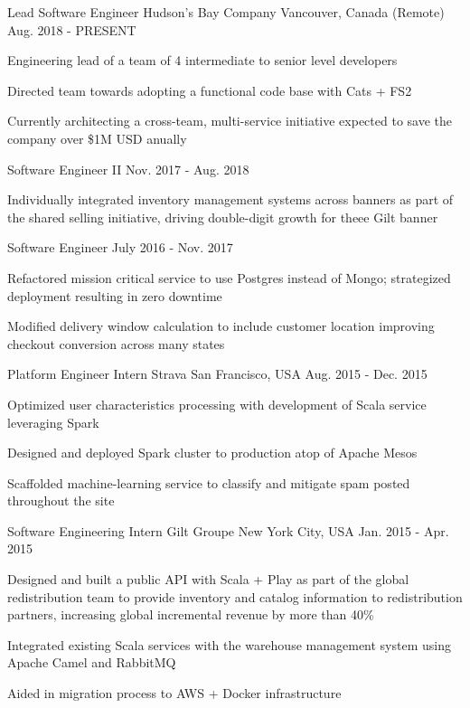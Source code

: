 \begin{cventries}
  \cventry
    {Lead Software Engineer}
    {Hudson's Bay Company}
    {Vancouver, Canada (Remote)}
    {Aug. 2018 - PRESENT}
    {
      \begin{cvitems}
        \item {Engineering lead of a team of 4 intermediate to senior level developers}
        \item {Directed team towards adopting a functional code base with Cats + FS2}
        \item {Currently architecting a cross-team, multi-service
            initiative expected to save the company over \$1M USD anually}
      \end{cvitems}
    }
  \cventry
    {Software Engineer II}
    {}
    {}
    {Nov. 2017 - Aug. 2018}
    {
      \begin{cvitems}
        \item {Individually integrated inventory management systems across banners as part of
            the shared selling initiative, driving double-digit growth for theee Gilt banner}
      \end{cvitems}
    }
  \cventry
    {Software Engineer}
    {}
    {}
    {July 2016 - Nov. 2017}
    {
      \begin{cvitems}
        \item {Refactored mission critical service to use Postgres instead of Mongo; strategized deployment resulting in zero downtime}
        \item {Modified delivery window calculation to include customer location improving checkout conversion across many states}
      \end{cvitems}
    }
  \cventry
    {Platform Engineer Intern}
    {Strava}
    {San Francisco, USA}
    {Aug. 2015 - Dec. 2015}
    {
      \begin{cvitems}
        \item {Optimized user characteristics processing with development of Scala service leveraging Spark}
        \item {Designed and deployed Spark cluster to production atop of Apache Mesos}
        \item {Scaffolded machine-learning service to classify and mitigate spam posted throughout the site}
      \end{cvitems}
    }
  \cventry
    {Software Engineering Intern}
    {Gilt Groupe}
    {New York City, USA}
    {Jan. 2015 - Apr. 2015}
    {
      \begin{cvitems}
        \item {Designed and built a public API with Scala + Play as part of the global redistribution team to provide inventory and catalog information to redistribution partners, increasing global incremental revenue by more than 40\%}
        \item {Integrated existing Scala services with the warehouse management system using Apache Camel and RabbitMQ}
        \item {Aided in migration process to AWS + Docker infrastructure}
      \end{cvitems}
    }
\end{cventries}
